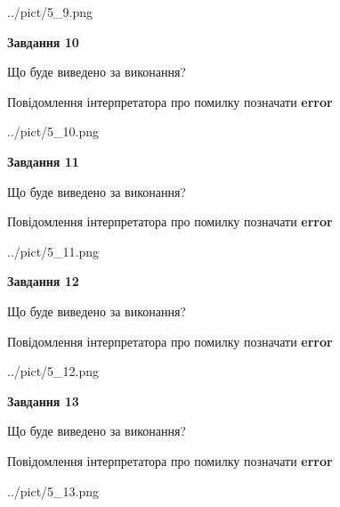 \documentclass[11pt, ukrainian]{article}
\begin{document}
{\begin {large}
\begin{center}
	{../pict/5_9.png}
\end{center}
\newpage

{\begin {center}\textbf{Завдання 10}\end {center}}\par
Що буде виведено за виконання? \par
Повідомлення інтерпретатора про помилку позначати \textbf{error}

\begin{center}
	{../pict/5_10.png}
\end{center}
\newpage

{\begin {center}\textbf{Завдання 11}\end {center}}\par
Що буде виведено за виконання? \par
Повідомлення інтерпретатора про помилку позначати \textbf{error}

\begin{center}
	{../pict/5_11.png}
\end{center}
\newpage

{\begin {center}\textbf{Завдання 12}\end {center}}\par
Що буде виведено за виконання? \par
Повідомлення інтерпретатора про помилку позначати \textbf{error}

\begin{center}
	{../pict/5_12.png}
\end{center}
\newpage

{\begin {center}\textbf{Завдання 13}\end {center}}\par
Що буде виведено за виконання? \par
Повідомлення інтерпретатора про помилку позначати \textbf{error}

\begin{center}
	{../pict/5_13.png}
\end{center}
\newpage


\end{large}}
\end{document}
